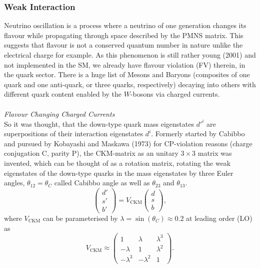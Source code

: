 \subsubsection{Weak Interaction}
Neutrino oscillation is a process where a neutrino of one generation changes its flavour while propagating through space described by the PMNS matrix. 
This suggests that 
flavour is not a conserved quantum number in nature unlike the electrical charge for example. As this phenomenon is still rather young (2001) and not implemented in the 
SM, we already have flavour violation (FV) therein, in the quark sector. There is a huge list of Mesons and Baryons (composites of one quark and one anti-quark,
or three quarks, respectively) decaying into others with different quark content enabled by the $W$-bosons via charged currents. 
\\ \\ \textit{Flavour Changing Charged Currents}\\
\noindent So it was thought, that the down-type quark mass
eigenstates $d'^i$ are superpositions of their interaction eigenstates $d^i$. Formerly started by Cabibbo and pursued by 
Kobayashi and Maskawa (1973) for CP-violation reasons (charge conjugation C, parity P), the CKM-matrix as an unitary $3\times 3$ matrix was invented,
which can be thought of as a rotation
matrix, rotating the weak eigenstates of the down-type quarks in the mass eigenstates by three Euler angles, $\theta_{12} = \theta_C$ called Cabibbo angle 
as well as $\theta_{23}$ and $\theta_{13}$.
\begin{equation}
 \begin{pmatrix}
  d' \\ s' \\ b'
 \end{pmatrix} = V_\text{CKM}  \begin{pmatrix}
  d \\ s \\ b
 \end{pmatrix},
\end{equation}
\noindent
where $V_\text{CKM}$ can be parameterised by $\lambda = \sin(\theta_C) \approx 0.2$ at leading order (LO) as
\begin{equation}
 V_\text{CKM} \approx \begin{pmatrix}
  1 & \lambda & \lambda^3\\
  -\lambda & 1 & \lambda^2\\
  -\lambda^3 & -\lambda^2 & 1
 \end{pmatrix}.
\end{equation}
